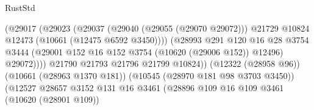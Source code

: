 \begin{lexlean}{RustStd}
\begin{coremodule}
                                                    (@29017
                                                      (@29023
                                                        (@29037
                                                          (@29040 (@29055 (@29070 @29072)))
                                                          @21729
                                                          @10824
                                                          @12473
                                                          (@10661 (@12475 @6592 @3450))))
                                                      (@28993
                                                        @291
                                                        @120
                                                        @16
                                                        @28
                                                        @3754
                                                        @3444
                                                        (@29001
                                                          @152
                                                          @16
                                                          @152
                                                          @3754
                                                          (@10620 (@29006 @152))
                                                          @12496)
                                                        @29072))))
                                                @21790
                                                @21793
                                                @21796
                                                @21799
                                                @10824))
                                            (@12322 (@28958 @96))
                                            (@10661 (@28963 @1370 @181))
                                            (@10545 (@28970 @181 @98 @3703 @3450))
                                            (@12527
                                              @28657
                                              @3152
                                              @131
                                              @16
                                              @3461
                                              (@28896
                                                @109
                                                @16
                                                @109
                                                @3461
                                                (@10620 (@28901 @109))

\end{coremodule}
\end{lexlean}
